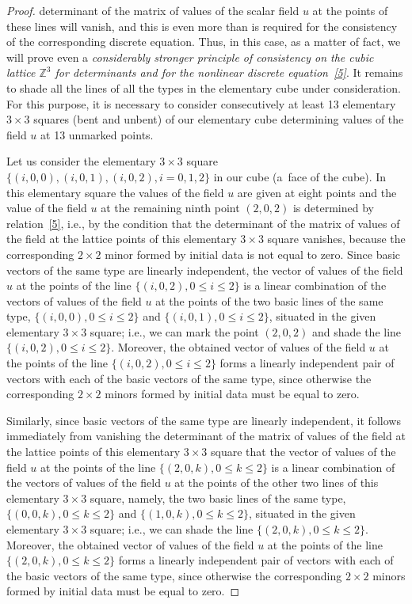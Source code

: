 \begin{proof}
determinant of the matrix of values of the scalar f\/ield $u$ at the
points of these lines will vanish, and this is even more than is
required for the consistency of the corresponding discrete equation.
Thus, in this case, as a matter of fact, we will prove even a {\it
considerably stronger principle of consistency on the cubic lattice
$\mathbb{Z}^3$ for determinants and for the nonlinear discrete
equation~\eqref{5}}. It remains to shade all the lines of all
the types in the elementary cube under consideration. For this
purpose, it is necessary to consider consecutively at least 13
elementary $3 \times 3$ squares (bent and unbent) of our elementary
cube determining values of the f\/ield $u$ at 13 unmarked points.


Let us consider the elementary $3 \times 3$ square $\{(i, 0, 0), (i,
0, 1), (i, 0, 2), i = 0, 1, 2\}$ in our cube (a~face of the cube).
In this elementary square the values of the f\/ield $u$ are given at
eight points and the value of the f\/ield $u$ at the remaining ninth
point $(2, 0, 2)$ is determined by relation~\eqref{5}, i.e.,
by the condition that the determinant of the matrix of values of the
f\/ield at the lattice points of this elementary $3 \times 3$ square
vanishes, because the corresponding $2 \times 2$ minor formed by
initial data is not equal to zero. Since basic vectors of the same
type are linearly independent, the vector of values of the f\/ield $u$
at the points of the line $\{(i, 0, 2), 0 \leq i \leq 2\}$ is a
linear combination of the vectors of values of the f\/ield $u$ at the
points of the two basic lines of the same type, $\{(i, 0, 0), 0 \leq
i \leq 2\}$ and $\{(i, 0, 1), 0 \leq i \leq 2\}$, situated in the
given elementary $3 \times 3$ square; i.e., we can mark the point
$(2, 0, 2)$ and shade the line $\{(i, 0, 2), 0 \leq i \leq 2\}$.
Moreover, the obtained vector of values of the f\/ield $u$ at the
points of the line $\{(i, 0, 2), 0 \leq i \leq 2\}$ forms a linearly
independent pair of vectors with each of the basic vectors of the
same type, since otherwise the corresponding $2 \times 2$ minors
formed by initial data must be equal to zero.



Similarly, since basic vectors of the same type are linearly
independent, it follows imme\-diately from vanishing the determinant
of the matrix of values of the f\/ield at the lattice points of this
elementary $3 \times 3$ square that the vector of values of the
f\/ield $u$ at the points of the line $\{(2, 0, k), 0 \leq k \leq 2\}$
is a linear combination of the vectors of values of the f\/ield $u$ at
the points of the other two lines of this elementary $3 \times 3$
square, namely, the two basic lines of the same type, $\{(0, 0, k),
0 \leq k \leq 2\}$ and $\{(1, 0, k), 0 \leq k \leq 2\}$, situated in
the given elementary $3 \times 3$ square; i.e., we can shade the
line $\{(2, 0, k), 0 \leq k \leq 2\}$. Moreover, the obtained vector
of values of the f\/ield $u$ at the points of the line $\{(2, 0, k), 0
\leq k \leq 2\}$ forms a linearly independent pair of vectors with
each of the basic vectors of the same type, since otherwise the
corresponding $2 \times 2$ minors formed by initial data must be
equal to zero.



\end{proof}
